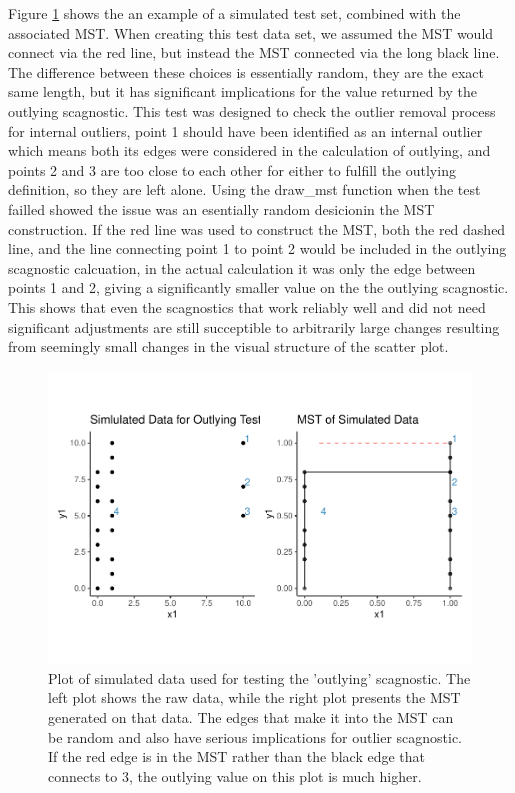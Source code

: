 Figure \ref{fig:outlying-test-plot} shows the an example of a simulated
test set, combined with the associated MST. When creating this test data
set, we assumed the MST would connect via the red line, but instead the
MST connected via the long black line. The difference between these
choices is essentially random, they are the exact same length, but it
has significant implications for the value returned by the outlying
scagnostic. This test was designed to check the outlier removal process
for internal outliers, point 1 should have been identified as an
internal outlier which means both its edges were considered in the
calculation of outlying, and points 2 and 3 are too close to each other
for either to fulfill the outlying definition, so they are left alone.
Using the draw\_mst function when the test failled showed the issue was
an esentially random desicionin the MST construction. If the red line
was used to construct the MST, both the red dashed line, and the line
connecting point 1 to point 2 would be included in the outlying
scagnostic calcuation, in the actual calculation it was only the edge
between points 1 and 2, giving a significantly smaller value on the the
outlying scagnostic. This shows that even the scagnostics that work
reliably well and did not need significant adjustments are still
succeptible to arbitrarily large changes resulting from seemingly small
changes in the visual structure of the scatter plot.

\begin{Schunk}
\begin{figure}
\includegraphics[width=0.8\linewidth]{mason-lee-laa-cook_files/figure-latex/outlying-test-plot-1} \caption[Plot of simulated data used for testing the 'outlying' scagnostic]{Plot of simulated data used for testing the 'outlying' scagnostic. The left plot shows the raw data, while the right plot presents the MST generated on that data. The edges that make it into the MST can be random and also have serious implications for outlier scagnostic. If the red edge is in the MST rather than the black edge that connects to 3, the outlying value on this plot is much higher.}\label{fig:outlying-test-plot}
\end{figure}
\end{Schunk}

